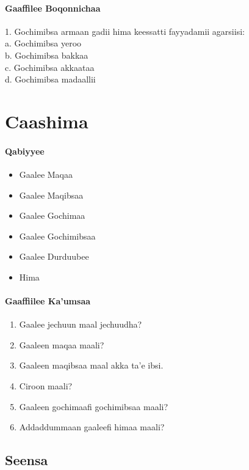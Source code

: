\documentclass[11pt,b5paper]{book}
\begin{document}
\subsubsection{Gaaffilee Boqonnichaa}
1. Gochimibsa armaan gadii hima keessatti fayyadamii agarsiisi:\\
a. Gochimibsa yeroo\\
b. Gochimibsa bakkaa\\
c. Gochimibsa akkaataa\\
d. Gochimibsa madaallii\\

\newpage

\chapter{Caashima}
\subsubsection{Qabiyyee}
\begin{itemize}
	\item Gaalee Maqaa
	\item Gaalee Maqibsaa
	\item Gaalee Gochimaa
	\item Gaalee Gochimibsaa
	\item Gaalee Durduubee
	\item Hima
\end{itemize}
\subsubsection{Gaaffiilee Ka'umsaa}
\begin{enumerate}
	\item Gaalee jechuun maal jechuudha?
	\item Gaaleen maqaa maali?
	\item Gaaleen maqibsaa maal akka ta'e ibsi.
	\item Ciroon maali?
	\item Gaaleen gochimaafi gochimibsaa maali?
	\item Addaddummaan gaaleefi himaa maali?
\end{enumerate}
	
	\section{Seensa}
	
\end{document}

